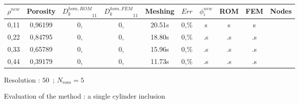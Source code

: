 {\begin{figure}[H]%
%
\begin{center}
\begin{tabular}{|c|c||c|c||c|c||c|c||c||c|}
\hline
\rowcolor{lightgray} $\rho^{new}$&Porosity&${D_k^{hom,ROM}}_{11}$&${D_k^{hom,FEM}}_{11}$&Meshing&$Err$&$\phi_i^{new}$&ROM&FEM&Nodes\\
\hline
0,11&0,96199&0,&0,&20.51s&0,\%&s&s&s&\\
\hline
0,22&0,84795&0,&0,&18.80s&0,\%&.s&.s&.s&\\
\hline
0,33&0,65789&0,&0,&15.96s&0,\%&.s&.s&.s&\\
\hline
0,44&0,39179&0,&0,&11.73s&0,\%&.s&.s&.s&\\
\hline
\end{tabular}
\end{center}
\caption{Resolution : $50$\ ; $N_{rom}=5$}
%
\end{figure}

\ligneinter

\begin{figure}[H]%
%
\begin{table}[H]
\begin{center}
%
%
\qquad
{}%
%
\end{center}
\end{table}
%
\caption{Evaluation of the method : a single cylinder inclusion}
\end{figure}

}
